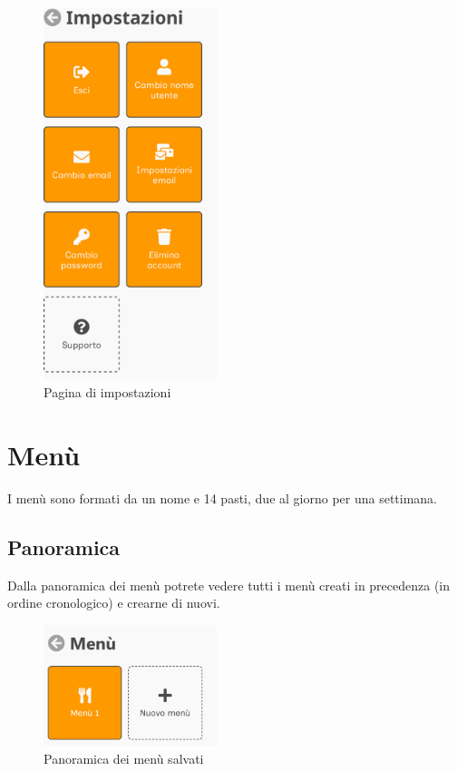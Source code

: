 \documentclass[12pt, a4paper]{report}
\begin{document}
    \begin{figure}[H]
        \centering
        \includegraphics[width=0.45\textwidth]{assets/it/settings.png}
        \caption{Pagina di impostazioni}
    \end{figure}


    \chapter{Menù}

    I menù sono formati da un nome e 14 pasti, due al giorno per una settimana.

    \section{Panoramica}

    Dalla panoramica dei menù potrete vedere tutti i menù creati in precedenza (in ordine cronologico) e crearne di nuovi.

    \begin{figure}[H]
        \centering
        \includegraphics[width=0.45\textwidth]{assets/it/menus.png}
        \caption{Panoramica dei menù salvati}
    \end{figure}
\end{document}
